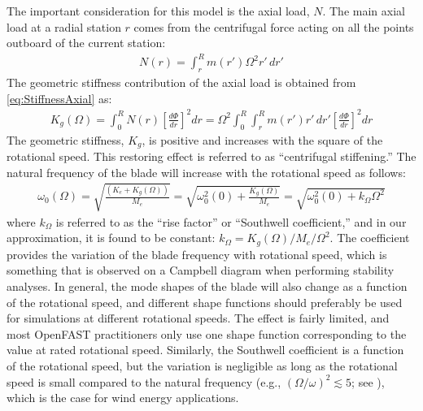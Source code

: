 \documentclass[wes, manuscript]{copernicus}
\begin{document}
The important consideration for this model is the axial load, $N$.
The main axial load at a radial station $r$ comes from the centrifugal force acting on all the points outboard of the current station:
\begin{align}
    N(r)=\int_r^R m(r') \Omega^2  r' \, dr'
\end{align}
The geometric stiffness contribution of the axial load is obtained from \autoref{eq:StiffnessAxial} as:
\begin{align}
    K_g(\Omega) = \int_0^R N(r) \left[\frac{d\Phi}{dr} \right]^2  dr  
    = \Omega^2 \int_0^R \int_r^R m(r') r' \, dr'
 \left[\frac{d\Phi}{dr} \right]^2 dr  
 \label{eq:GeomStiffCentri}
\end{align}
% 
The geometric stiffness, $K_g$, is positive and increases with the square of the rotational speed. 
This restoring effect is referred to as ``centrifugal stiffening.''
The natural frequency of the blade will increase with the rotational speed as follows:
\begin{align}
   \omega_0(\Omega)=\sqrt{\frac{(K_{e}+ K_g(\Omega))}{M_e}} 
   = \sqrt{ \omega_0^2(0) + \frac{K_g(\Omega)}{M_e} } 
   = \sqrt{ \omega_0^2(0) +  k_\Omega \Omega^2 } 
\end{align}
where $k_\Omega$ is referred to as the ``rise factor'' or ``Southwell coefficient,'' and in our approximation, it is found to be constant: $k_\Omega=K_g(\Omega)/M_e/\Omega^2$.
The coefficient provides the variation of the blade frequency with rotational speed, which is something that is observed on a Campbell diagram when performing stability analyses.
In general, the mode shapes of the blade will also change as a function of the rotational speed, and different shape functions should preferably be used for simulations at different rotational speeds.
The effect is fairly limited, and most OpenFAST practitioners only use one shape function corresponding to the value at rated rotational speed.
Similarly, the Southwell coefficient is a function of the rotational speed, but the variation is negligible as long as the rotational speed is small compared to the natural frequency (e.g., $(\Omega/\omega)^2 \lesssim 5$; see \cite{bielawa:2006:book}), which is the case for wind energy applications.
\end{document}
